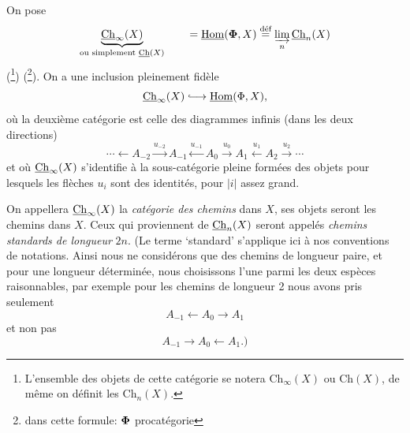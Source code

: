 On pose
\[
\underbrace{\underline{\mathrm{Ch}}_\infty(X)}_{\text{ou simplement }\underline{\mathrm{Ch}}(X)}\qquad=\underline{\mathrm{Hom}}(\boldsymbol{\Phi},X)\overset{\text{déf}}{=}\varinjlim_n\underline{\mathrm{Ch}}_n(X)
\]
(\footnote{L'ensemble des objets de cette catégorie se notera $\mathrm{Ch}_\infty(X)$ ou $\mathrm{Ch}(X)$, de même on définit les $\mathrm{Ch}_n(X)$.}) (\footnote{dans cette formule: $\boldsymbol{\Phi}$ procatégorie}). On a une inclusion pleinement fidèle
\[
\uCh_\infty(X)\lhook\joinrel\longrightarrow\uHom(\Phi,X),
\]
où la deuxième catégorie est celle des diagrammes infinis (dans les deux directions)
\[
\cdots\longleftarrow A_{-2}\xrightarrow{u_{-2}}A_{-1}\xleftarrow{u_{-1}}A_0\xrightarrow{u_0}A_1\xleftarrow{u_1}A_2\xrightarrow{u_2}\cdots
\]
et où $\underline{\mathrm{Ch}}_\infty(X)$ s'identifie à la sous-catégorie pleine formées des objets pour lesquels les flèches $u_i$ sont des identités, pour $|i|$ assez grand. %

On appellera $\underline{\mathrm{Ch}}_\infty(X)$ la \textit{catégorie des chemins} dans $X$, ses objets seront les chemins dans $X$. Ceux qui proviennent de $\underline{\mathrm{Ch}}_n(X)$ seront appelés \textit{chemins standards de longueur} $2n$. (Le terme `standard' s'applique ici à nos conventions de notations. Ainsi nous ne considérons que des chemins de longueur paire, et pour une longueur déterminée, nous choisissons l'une parmi les deux espèces raisonnables, par exemple pour les chemins de longueur 2 nous avons pris seulement
\[
A_{-1}\longleftarrow A_0\longrightarrow A_1
\]
et non pas
\[
A_{-1}\longrightarrow A_0\longleftarrow A_1.)
\]

